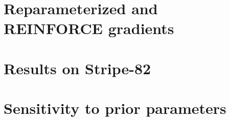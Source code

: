 \documentclass[12pt]{article}
\begin{document}
\appendix
\section{Reparameterized and REINFORCE gradients}
\label{sec:reparam_details}


\section{Results on Stripe-82}
\label{sec:results_sparse_field}


\section{Sensitivity to prior parameters}
\label{sec:prior_sensitivity}


% 

% 
\end{document}
